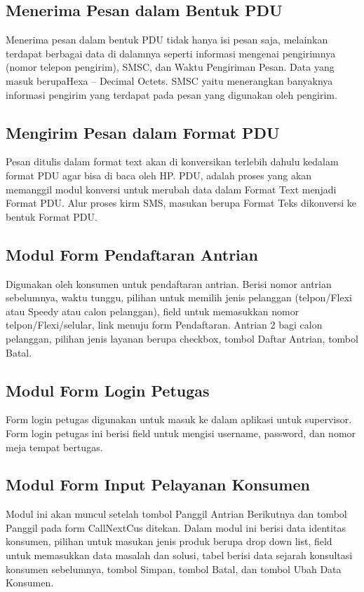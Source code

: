 \documentclass[12pt,a4paper]{article}
\begin{document}
\subsection{Menerima Pesan dalam Bentuk PDU}
Menerima pesan dalam bentuk PDU tidak hanya isi pesan saja, melainkan terdapat berbagai data di dalamnya seperti informasi mengenai pengirimnya (nomor telepon pengirim), SMSC, dan Waktu Pengiriman Pesan. Data yang masuk berupaHexa – Decimal Octets. SMSC yaitu menerangkan banyaknya informasi pengirim yang terdapat pada pesan yang digunakan oleh pengirim.
\subsection{Mengirim Pesan dalam Format PDU}
Pesan ditulis dalam format text akan di konversikan terlebih dahulu kedalam format PDU agar bisa di baca oleh HP. PDU, adalah proses yang akan memanggil modul konversi untuk merubah data dalam Format Text menjadi Format PDU.  Alur proses kirm SMS, masukan berupa Format Teks dikonversi ke bentuk Format PDU.
\subsection{Modul Form Pendaftaran Antrian}
Digunakan oleh konsumen untuk pendaftaran antrian. Berisi nomor antrian sebelumnya, waktu tunggu, pilihan untuk memilih jenis pelanggan (telpon/Flexi atau Speedy atau calon pelanggan), field untuk memasukkan nomor telpon/Flexi/selular, link menuju form Pendaftaran. Antrian 2 bagi calon pelanggan, pilihan jenis layanan berupa checkbox, tombol Daftar Antrian, tombol Batal.
\subsection{Modul Form Login Petugas}
Form login petugas digunakan untuk masuk ke dalam aplikasi untuk supervisor. Form login petugas ini berisi
field untuk mengisi username, password, dan nomor meja tempat bertugas. 
\subsection{Modul Form Input Pelayanan Konsumen}
Modul ini akan muncul setelah tombol Panggil Antrian Berikutnya dan tombol Panggil pada form CallNextCus ditekan. 
Dalam modul ini berisi data identitas konsumen, pilihan untuk masukan jenis produk berupa drop down list,
field untuk memasukkan data masalah dan solusi, tabel berisi data sejarah konsultasi konsumen sebelumnya, tombol Simpan, tombol
Batal, dan tombol Ubah Data Konsumen. 
\end{document}
